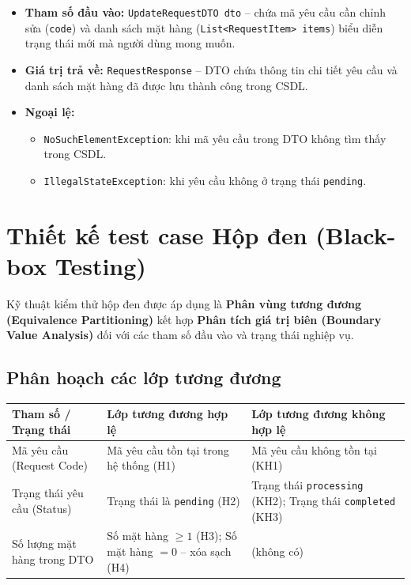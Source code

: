 \documentclass[12pt,a4paper]{article}
\begin{document}
\begin{itemize}[leftmargin=*]
  \item \textbf{Tham số đầu vào:} \texttt{UpdateRequestDTO dto} -- chứa mã yêu cầu cần chỉnh sửa (\texttt{code}) và danh sách mặt hàng (\texttt{List<RequestItem> items}) biểu diễn trạng thái mới mà người dùng mong muốn.
  \item \textbf{Giá trị trả về:} \texttt{RequestResponse} -- DTO chứa thông tin chi tiết yêu cầu và danh sách mặt hàng đã được lưu thành công trong CSDL.
  \item \textbf{Ngoại lệ:}
  \begin{itemize}
    \item \texttt{NoSuchElementException}: khi mã yêu cầu trong DTO không tìm thấy trong CSDL.
    \item \texttt{IllegalStateException}: khi yêu cầu không ở trạng thái \texttt{pending}.
  \end{itemize}
\end{itemize}

\section{Thiết kế test case Hộp đen (Black-box Testing)}

Kỹ thuật kiểm thử hộp đen được áp dụng là \textbf{Phân vùng tương đương (Equivalence Partitioning)} kết hợp \textbf{Phân tích giá trị biên (Boundary Value Analysis)} đối với các tham số đầu vào và trạng thái nghiệp vụ.

\subsection{Phân hoạch các lớp tương đương}
\begin{table}[H]
\centering
\footnotesize
\begin{tabularx}{\textwidth}{|p{3.4cm}|Y|Y|}
\hline
{}
\textbf{Tham số / Trạng thái} & \textbf{Lớp tương đương hợp lệ} & \textbf{Lớp tương đương không hợp lệ}\\ \hline
Mã yêu cầu (Request Code) & Mã yêu cầu tồn tại trong hệ thống (H1) & Mã yêu cầu không tồn tại (KH1)\\ \hline
Trạng thái yêu cầu (Status) & Trạng thái là \texttt{pending} (H2) & Trạng thái \texttt{processing} (KH2); Trạng thái \texttt{completed} (KH3)\\ \hline
Số lượng mặt hàng trong DTO & Số mặt hàng $\geq 1$ (H3); Số mặt hàng $= 0$ -- xóa sạch (H4) & (không có) \\ \hline
\end{tabularx}
\end{table}
\end{document}
